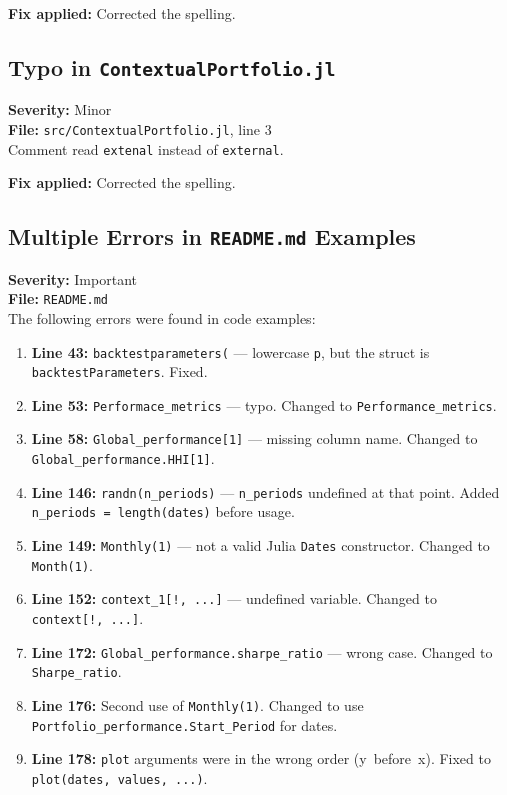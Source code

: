 \documentclass[11pt,a4paper]{article}
\begin{document}
\textbf{Fix applied:} Corrected the spelling.

\subsection{Typo in \texttt{ContextualPortfolio.jl}}
\label{sec:typo-main}

\textbf{Severity:} Minor\\
\textbf{File:} \texttt{src/ContextualPortfolio.jl}, line 3\\[0.3em]
Comment read \texttt{extenal} instead of \texttt{external}.

\textbf{Fix applied:} Corrected the spelling.

\subsection{Multiple Errors in \texttt{README.md} Examples}
\label{sec:readme}

\textbf{Severity:} Important\\
\textbf{File:} \texttt{README.md}\\[0.3em]
The following errors were found in code examples:

\begin{enumerate}
  \item \textbf{Line 43:} \texttt{backtestparameters(} --- lowercase \texttt{p},
    but the struct is \texttt{backtestParameters}. Fixed.
  \item \textbf{Line 53:} \texttt{Performace\_metrics} --- typo. Changed to
    \texttt{Performance\_metrics}.
  \item \textbf{Line 58:} \texttt{Global\_performance[1]} --- missing column name.
    Changed to \texttt{Global\_performance.HHI[1]}.
  \item \textbf{Line 146:} \texttt{randn(n\_periods)} --- \texttt{n\_periods}
    undefined at that point. Added \texttt{n\_periods = length(dates)} before usage.
  \item \textbf{Line 149:} \texttt{Monthly(1)} --- not a valid Julia \texttt{Dates}
    constructor. Changed to \texttt{Month(1)}.
  \item \textbf{Line 152:} \texttt{context\_1[!,~...]} --- undefined variable.
    Changed to \texttt{context[!,~...]}.
  \item \textbf{Line 172:} \texttt{Global\_performance.sharpe\_ratio} --- wrong
    case. Changed to \texttt{Sharpe\_ratio}.
  \item \textbf{Line 176:} Second use of \texttt{Monthly(1)}. Changed to use
    \texttt{Portfolio\_performance.Start\_Period} for dates.
  \item \textbf{Line 178:} \texttt{plot} arguments were in the wrong order
    (y~before~x). Fixed to \texttt{plot(dates, values, ...)}.
\end{enumerate}
\end{document}
